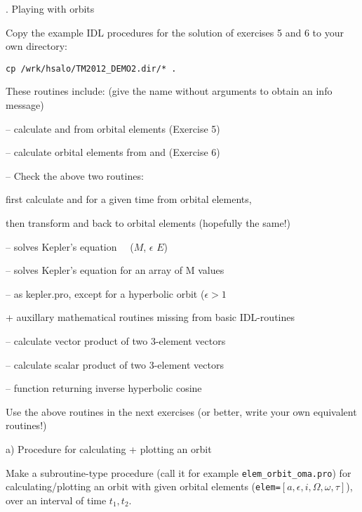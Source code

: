 \documentclass[a4paper,12pt]{article}
\begin{document}
{{\newpage
{. Playing with orbits}


Copy the example IDL procedures for the solution of exercises 5 and 6
to your own directory:

{\tt cp /wrk/hsalo/TM2012\_DEMO2.dir/* .}

\noindent These routines include: (give the name without arguments to obtain an info message)


{\parskip 0.05cm


 -- calculate \RR and \VV from orbital elements (Exercise 5)

 -- calculate orbital elements from \RR and \VV (Exercise 6)

 -- Check the above two routines:

\buu  first calculate \RR and \VV for a given time from orbital elements, 

\buu then transform \RR and \VV back to orbital elements (hopefully the same!)


 -- solves Kepler's equation \ \ ($M$, $\epsilon$ \arrow $E$)

 -- solves Kepler's equation for an array of M values

 -- as kepler.pro, except for a hyperbolic orbit ($\epsilon>1$
}

\noindent + auxillary mathematical routines missing from basic IDL-routines

{\parskip 0.15cm

 -- calculate vector product of two 3-element vectors

 -- calculate scalar product of two 3-element vectors

 -- function returning inverse hyperbolic cosine
}


Use the above routines in the next exercises (or better, write your own equivalent routines!)



\vskip 0.5cm

{\medb a) Procedure for calculating + plotting an orbit} 


Make a subroutine-type procedure (call it for example {\tt elem\_orbit\_oma.pro})
for calculating/plotting an orbit with given
orbital elements  ({\tt elem=$[a, \epsilon, i, \Omega, \omega, \tau]$}), over an interval of time $t_1, t_2$.

}}
\end{document}
